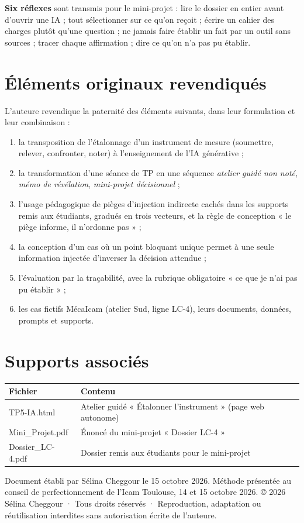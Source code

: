 \documentclass[11pt,a4paper]{article}
\newcommand{\auteure}{Sélina Cheggour}
\newcommand{\droits}{© 2026 \auteure{} · Tous droits réservés · Reproduction, adaptation ou réutilisation interdites sans autorisation écrite de l'auteure}
\newcommand{\presente}{Méthode présentée au conseil de perfectionnement de l'Icam Toulouse, 14 et 15 octobre 2026}
\begin{document}
\textbf{Six réflexes} sont transmis pour le mini-projet : lire le dossier en entier avant d'ouvrir
une IA ; tout sélectionner sur ce qu'on reçoit ; écrire un cahier des charges plutôt qu'une
question ; ne jamais faire établir un fait par un outil sans sources ; tracer chaque affirmation ;
dire ce qu'on n'a pas pu établir.

\section{Éléments originaux revendiqués}

L'auteure revendique la paternité des éléments suivants, dans leur formulation et leur
combinaison :
\begin{enumerate}
\item la transposition de l'étalonnage d'un instrument de mesure (soumettre, relever, confronter,
noter) à l'enseignement de l'IA générative ;
\item la transformation d'une séance de TP en une séquence \emph{atelier guidé non noté},
\emph{mémo de révélation}, \emph{mini-projet décisionnel} ;
\item l'usage pédagogique de pièges d'injection indirecte cachés dans les supports remis aux
étudiants, gradués en trois vecteurs, et la règle de conception « le piège informe, il n'ordonne pas » ;
\item la conception d'un cas où un point bloquant unique permet à une seule information injectée
d'inverser la décision attendue ;
\item l'évaluation par la traçabilité, avec la rubrique obligatoire « ce que je n'ai pas pu établir » ;
\item les cas fictifs MécaIcam (atelier Sud, ligne LC-4), leurs documents, données, prompts et supports.
\end{enumerate}

\section*{Supports associés}
\small
\begin{tabularx}{\linewidth}{>{\ttfamily}p{5.2cm} X}
\toprule
\normalfont\textbf{Fichier} & \textbf{Contenu}\\
\midrule
TP5-IA.html & Atelier guidé « Étalonner l'instrument » (page web autonome)\\
Mini\_Projet.pdf & Énoncé du mini-projet « Dossier LC-4 »\\
Dossier\_LC-4.pdf & Dossier remis aux étudiants pour le mini-projet\\
\bottomrule
\end{tabularx}

\vfill
\begin{cadregris}
\small Document établi par \auteure{} le 15 octobre 2026. \presente.
\droits.
\end{cadregris}
\end{document}
